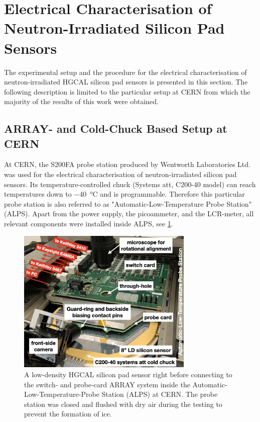 \section{Electrical Characterisation of Neutron-Irradiated Silicon Pad Sensors}
\label{sec:setup}
The experimental setup and the procedure for the electrical characterisation of neutron-irradiated HGCAL silicon pad sensors is presented in this section.
The following description is limited to the particular setup at CERN from which the majority of the results of this work were obtained.

\subsection{ARRAY- and Cold-Chuck Based Setup at CERN}
\label{subsec:setup_alps}
At CERN, the S200FA probe station produced by Wentworth Laboratories Ltd. was used for the electrical characterisation of neutron-irradiated silicon pad sensors. 
Its temperature-controlled chuck (Systems att, C200-40 model) can reach temperatures down to \SI{-40}{\celsius} and is programmable.
Therefore this particular probe station is also referred to as "Automatic-Low-Temperature Probe Station" (ALPS).
Apart from the power supply, the picoammeter, and the LCR-meter, all relevant components were installed inside ALPS, see \ref{fig:ALPS_setup}.
\begin{figure}[h]
	\centering
	\includegraphics[width=0.75\textwidth]{figures/ALPS_photo_edit.jpeg}
	\caption{
		A low-density HGCAL silicon pad sensor right before connecting to the switch- and probe-card ARRAY system inside the Automatic-Low-Temperature-Probe Station (ALPS) at CERN.
		The probe station was closed and flushed with dry air during the testing to prevent the formation of ice.
		}
		\label{fig:ALPS_setup}
	\end{figure}
